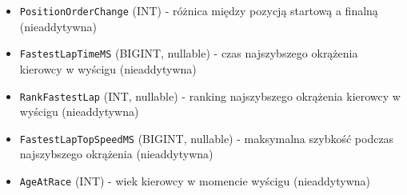 \documentclass[a4paper,12pt]{article}
\begin{document}
\begin{itemize}[label=\textbullet, leftmargin=*]
\begin{itemize}[label=\textendash, leftmargin=1em]
          \item \texttt{PositionOrderChange} (INT) - różnica między pozycją startową a finalną (nieaddytywna)
          \item \texttt{FastestLapTimeMS} (BIGINT, nullable) - czas najszybszego okrążenia kierowcy w wyścigu (nieaddytywna)
          \item \texttt{RankFastestLap} (INT, nullable) - ranking najszybszego okrążenia kierowcy w wyścigu (nieaddytywna)
          \item \texttt{FastestLapTopSpeedMS} (BIGINT, nullable) - maksymalna szybkość podczas najszybszego okrążenia (nieaddytywna)
          \item \texttt{AgeAtRace} (INT) - wiek kierowcy w momencie wyścigu (nieaddytywna)
        \end{itemize}
\end{itemize}
\end{document}
